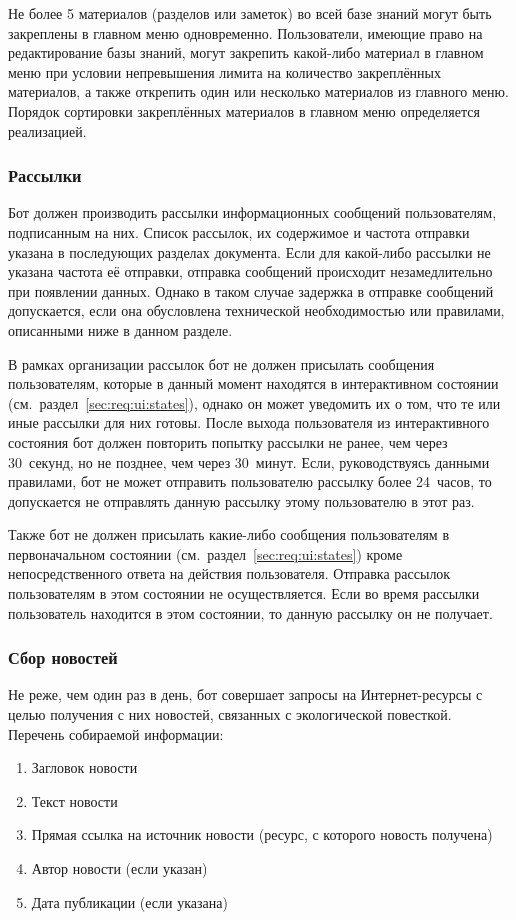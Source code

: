     Не более 5 материалов (разделов или заметок) во всей базе знаний могут быть закреплены в
    главном меню одновременно.  Пользователи, имеющие право на редактирование базы знаний,
    могут закрепить какой-либо материал в главном меню при условии непревышения лимита на
    количество закреплённых материалов, а также открепить один или несколько материалов из
    главного меню. Порядок сортировки закреплённых материалов в главном меню определяется
    реализацией.

\subsubsection{Рассылки}
    \label{sec:req:fn:newsletter}
    Бот должен производить рассылки информационных сообщений
    пользователям, подписанным на них. Список рассылок,
    их содержимое и частота отправки указана в последующих разделах документа.
    Если для какой-либо рассылки не указана частота её отправки, отправка сообщений происходит
    незамедлительно при появлении данных. Однако в таком случае задержка в отправке сообщений допускается,
    если она обусловлена технической необходимостью или правилами, описанными ниже в данном разделе.

    В рамках организации рассылок бот не должен присылать сообщения пользователям,
    которые в данный момент находятся в интерактивном состоянии (см.~раздел~\ref{sec:req:ui:states}),
    однако он может уведомить их о том, что те или иные рассылки для них готовы.
    После выхода пользователя из интерактивного состояния бот должен повторить попытку
    рассылки не ранее, чем через 30~секунд, но не позднее, чем через 30~минут.
    Если, руководствуясь данными правилами, бот не может отправить пользователю рассылку
    более 24~часов, то допускается не отправлять данную рассылку этому пользователю в этот раз.

    Также бот не должен присылать какие-либо сообщения пользователям в первоначальном
    состоянии (см.~раздел~\ref{sec:req:ui:states}) кроме непосредственного ответа на действия
    пользователя. Отправка рассылок пользователям в этом состоянии не осуществляется. Если
    во время рассылки пользователь находится в этом состоянии, то данную рассылку он не получает.

\subsubsection{Сбор новостей}
    \label{sec:req:fn:grabnews}
    Не реже, чем один раз в день, бот совершает запросы на Интернет-ресурсы с целью получения с них
    новостей, связанных с экологической повесткой. Перечень собираемой информации:
    \begin{enumerate}
        \item
            Загловок новости
        \item
            Текст новости
        \item
            Прямая ссылка на источник новости (ресурс, с которого новость получена)
        \item
            Автор новости (если указан)
        \item
            Дата публикации (если указана)
    \end{enumerate}


